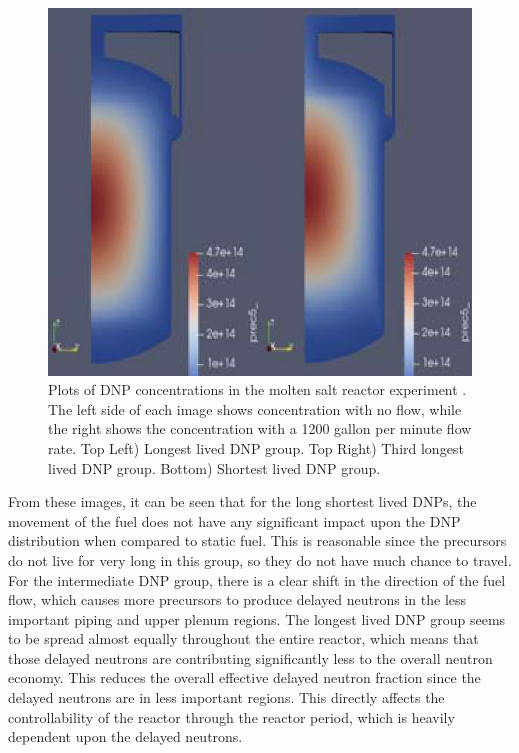 \begin{figure}[H]
  \includegraphics[scale=0.25]{images/dnp6.PNG}
  \caption{Plots of DNP concentrations in the molten salt reactor experiment \cite{shi_gen-foam_2021}. The left side of each image shows concentration with no flow, while the right shows the concentration with a 1200 gallon per minute flow rate. Top Left) Longest lived DNP group. Top Right) Third longest lived DNP group. Bottom) Shortest lived DNP group.}
   \label{fig:genfoam_dnp_locations}
\end{figure}



From these images, it can be seen that for the long shortest lived DNPs, the movement of the fuel does not have any significant impact upon the DNP distribution when compared to static fuel. This is reasonable since the precursors do not live for very long in this group, so they do not have much chance to travel. For the intermediate DNP group, there is a clear shift in the direction of the fuel flow, which causes more precursors to produce delayed neutrons in the less important piping  and upper plenum regions. The longest lived DNP group seems to be spread almost equally throughout the entire reactor, which means that those delayed neutrons are contributing significantly less to the overall neutron economy. This reduces the overall effective delayed neutron fraction since the delayed neutrons are in less important regions. This directly affects the controllability of the reactor through the reactor period, which is heavily dependent upon the delayed neutrons.

